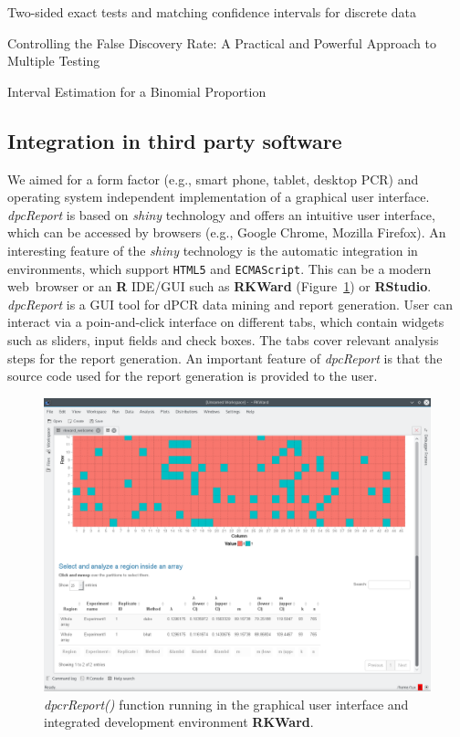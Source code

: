 \documentclass[a4,center,fleqn]{NAR}
\begin{document}
Two-sided exact tests and matching confidence intervals for discrete data \cite{fay_2010}

Controlling the False Discovery Rate: A Practical and Powerful Approach to Multiple Testing \cite{benjamini_1995}

Interval Estimation for a Binomial Proportion \cite{brown_2001}

\subsection{Integration in third party software}

We aimed for a form factor (e.g., smart phone, tablet, desktop PCR) and 
operating system independent implementation of a graphical user interface. 
\textit{dpcReport} is based on \textit{shiny} technology and offers an intuitive 
user interface, which can be accessed by browsers (e.g., Google Chrome, Mozilla 
Firefox).  An interesting feature of the \textit{shiny} technology is the 
automatic integration in environments, which support \texttt{HTML5} and 
\texttt{ECMAScript}. This can be a modern web~browser or an \textbf{R} IDE/GUI 
such as \textbf{RKWard} (Figure~\ref{GUI_RKWard_1}) \cite{rodiger_rkward_2012} 
or \textbf{RStudio}. \textit{dpcReport} is a GUI tool for dPCR data mining and 
report generation. User can interact via a poin-and-click interface on different 
tabs, which contain widgets such as sliders, input fields and check boxes. The 
tabs cover relevant analysis steps for the report generation.  An important 
feature of \textit{dpcReport} is that the source code used for the report 
generation is provided to the user.

\begin{figure}[t]
\begin{center}
\includegraphics[width=17cm]{GUI_RKWard_1.png}
\end{center}
\caption{\textit{dpcrReport()} function running in the graphical user interface and integrated development environment \textbf{RKWard}.}
\label{GUI_RKWard_1}
\end{figure}
\end{document}
